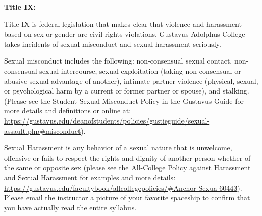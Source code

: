 \documentclass[11pt]{article}
\begin{document}
\textbf{\large Title IX:}

\hspace{3mm}
\hangindent=5mm Title IX is federal legislation that makes clear that violence and harassment based on sex or gender are civil rights violations. Gustavus Adolphus College takes incidents of sexual misconduct and sexual harassment seriously.
 
\hangindent=5mm Sexual misconduct includes the following: non-consensual sexual contact, non-consensual sexual intercourse, sexual exploitation (taking non-consensual or abusive sexual advantage of another), intimate partner violence (physical, sexual, or psychological harm by a current or former partner or spouse), and stalking. (Please see the Student Sexual Misconduct Policy in the Gustavus Guide for more details and definitions or online at:\url{ https://gustavus.edu/deanofstudents/policies/gustieguide/sexual-assault.php#misconduct}).
 
\hangindent=5mm Sexual Harassment is any behavior of a sexual nature that is unwelcome, offensive or fails to respect the rights and dignity of another person whether of the same or opposite sex (please see the All-College Policy against Harassment and Sexual Harassment for examples and more details: \url{https://gustavus.edu/facultybook/allcollegepolicies/#Anchor-Sexua-60443}).\\

Please email the instructor a picture of your favorite spaceship to confirm that you have actually read the entire syllabus.
\end{document}
